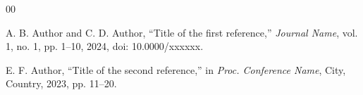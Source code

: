 \begin{thebibliography}{00}

A. B. Author and C. D. Author, ``Title of the first reference,''
\emph{Journal Name}, vol. 1, no. 1, pp. 1--10, 2024,
doi: 10.0000/xxxxxx.

E. F. Author, ``Title of the second reference,'' in
\emph{Proc. Conference Name}, City, Country, 2023, pp. 11--20.

\end{thebibliography}
